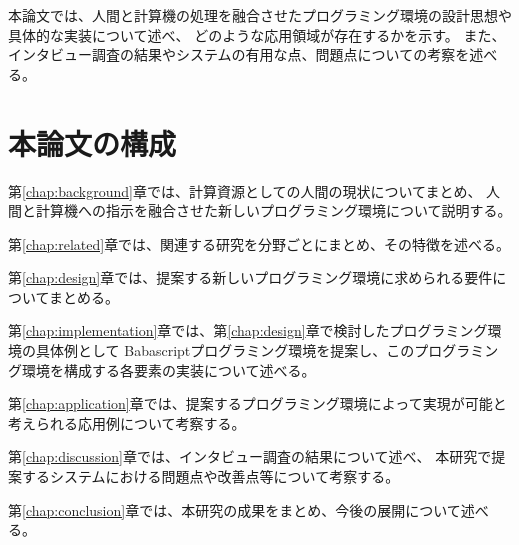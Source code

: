 本論文では、人間と計算機の処理を融合させたプログラミング環境の設計思想や具体的な実装について述べ、
どのような応用領域が存在するかを示す。
また、インタビュー調査の結果やシステムの有用な点、問題点についての考察を述べる。

\section{本論文の構成}\label{ux672cux8ad6ux6587ux306eux69cbux6210}

第\ref{chap:background}章では、計算資源としての人間の現状についてまとめ、
人間と計算機への指示を融合させた新しいプログラミング環境について説明する。

第\ref{chap:related}章では、関連する研究を分野ごとにまとめ、その特徴を述べる。

第\ref{chap:design}章では、提案する新しいプログラミング環境に求められる要件についてまとめる。

第\ref{chap:implementation}章では、第\ref{chap:design}章で検討したプログラミング環境の具体例として
Babascriptプログラミング環境を提案し、このプログラミング環境を構成する各要素の実装について述べる。

第\ref{chap:application}章では、提案するプログラミング環境によって実現が可能と考えられる応用例について考察する。

第\ref{chap:discussion}章では、インタビュー調査の結果について述べ、
本研究で提案するシステムにおける問題点や改善点等について考察する。

第\ref{chap:conclusion}章では、本研究の成果をまとめ、今後の展開について述べる。
